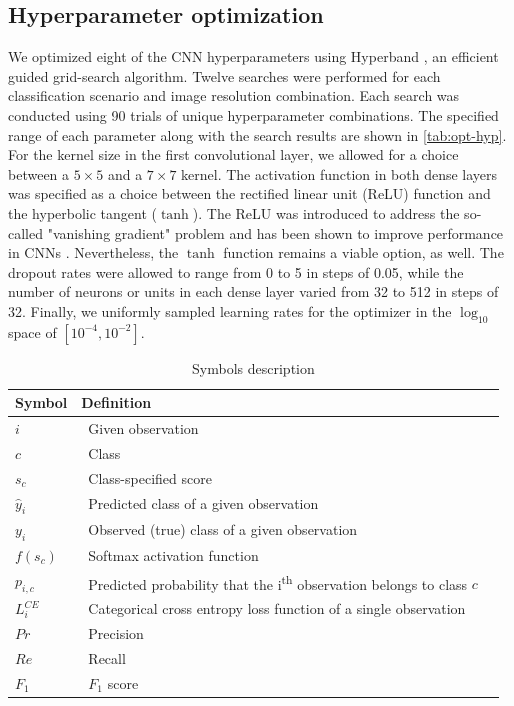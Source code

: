 \documentclass[Journal,letterpaper, SingleSpace, InsideFigs]{ascelike-new}
\begin{document}
\subsection{Hyperparameter optimization}
We optimized eight of the CNN hyperparameters using Hyperband \cite{li2018hyperband}, an efficient guided grid-search algorithm.
Twelve searches were performed for each classification scenario and image resolution combination.
Each search was conducted using 90 trials of unique hyperparameter combinations. The specified range of each parameter along with the search results are shown in \autoref{tab:opt-hyp}. For the kernel size in the first convolutional layer, we allowed for a choice between a $5\times 5$ and a $7\times 7$ kernel. The activation function in both dense layers was specified as a choice between the rectified linear unit (ReLU) function and the hyperbolic tangent ($\tanh$). The ReLU was introduced to address the so-called "vanishing gradient" problem and has been shown to improve performance in CNNs \cite{glorot2011deep}. Nevertheless, the $\tanh$ function remains a viable option, as well. The dropout rates were allowed to range from 0 to 5 in steps of 0.05, while the number of neurons or units in each dense layer varied from 32 to 512 in steps of 32. Finally, we uniformly sampled learning rates for the optimizer in the $\log_{10}$ space of $[10^{-4}, 10^{-2}]$.

\begin{table}[h!]
    \centering
    \begin{tabular}{l l c}\toprule
    \bf Symbol            & \bf Definition  \\\midrule
    $i$     &  \ Given observation \\
    $c$          & \ Class\\
    $s_c$        & \ Class-specified score \\
    $\hat y_i$       & \ Predicted class of a given observation \\
    $y_i$        & \ Observed (true) class of a given observation \\
    $f(s_c)$        & \ Softmax activation function \\
    $p_{i,c}$        & \ Predicted probability that the i\textsuperscript{th} observation belongs to class $c$ \\
    $L^{CE}_i$        & \ Categorical cross entropy loss function of a single observation \\
    $Pr$ & \ Precision \\
    $Re$ & \ Recall \\
    $F_1$ & \ $F_1$ score \\\bottomrule
    \end{tabular}
    \caption{Symbols description}
    \label{tab:symbols}
\end{table}
\end{document}
